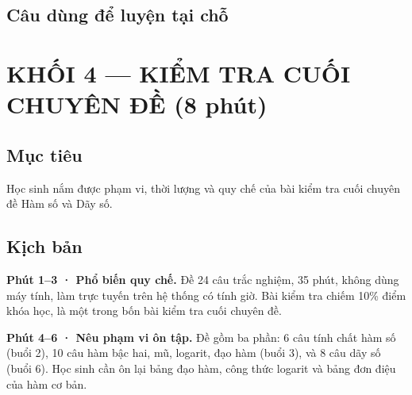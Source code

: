 \documentclass[11pt, a4paper]{article}
\begin{document}
\subsection{Câu dùng để luyện tại chỗ}


\section{KHỐI 4 — KIỂM TRA CUỐI CHUYÊN ĐỀ (8 phút)}

\subsection{Mục tiêu}

Học sinh nắm được phạm vi, thời lượng và quy chế của bài kiểm tra cuối chuyên đề Hàm số và Dãy số.

\subsection{Kịch bản}

\textbf{Phút 1–3 · Phổ biến quy chế.} Đề 24 câu trắc nghiệm, 35 phút, không dùng máy tính, làm trực tuyến trên hệ thống có tính giờ. Bài kiểm tra chiếm 10\% điểm khóa học, là một trong bốn bài kiểm tra cuối chuyên đề.

\textbf{Phút 4–6 · Nêu phạm vi ôn tập.} Đề gồm ba phần: 6 câu tính chất hàm số (buổi 2), 10 câu hàm bậc hai, mũ, logarit, đạo hàm (buổi 3), và 8 câu dãy số (buổi 6). Học sinh cần ôn lại bảng đạo hàm, công thức logarit và bảng đơn điệu của hàm cơ bản.
\end{document}
